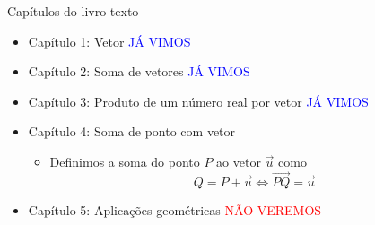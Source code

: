 
\begin{frame}{Capítulos do livro texto}
    \begin{itemize}
        \item Capítulo 1: Vetor \textcolor{blue}{JÁ VIMOS}
        \item Capítulo 2: Soma de vetores \textcolor{blue}{JÁ VIMOS}
        \item Capítulo 3: Produto de um número real por vetor \textcolor{blue}{JÁ VIMOS}
        \item Capítulo 4: Soma de ponto com vetor
            \begin{itemize}
                \item Definimos a soma do ponto \(P\) ao vetor \(\vec{u}\) como
                    \[
                        Q=P+\vec{u} \Longleftrightarrow \vec{PQ}=\vec{u}
                    \]
            \end{itemize}
        \item Capítulo 5: Aplicações geométricas \textcolor{red}{NÃO VEREMOS}

    \end{itemize}
\end{frame}

